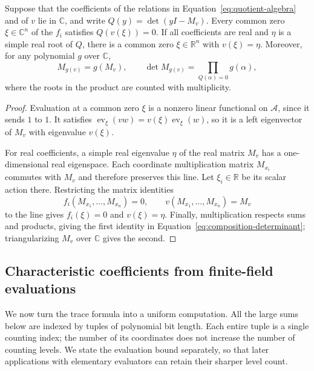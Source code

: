 \begin{lemma}\label{lem:real-eigenline}
Suppose that the coefficients of the relations in
Equation~\eqref{eq:quotient-algebra} and of $v$ lie in $\mathbb C$,
and write $Q(y)=\det(yI-M_v)$.  Every common zero
$\xi\in\mathbb C^n$ of the $f_i$ satisfies $Q(v(\xi))=0$.
If all coefficients are real and $\eta$ is a simple real root of $Q$,
there is a common zero $\xi\in\mathbb R^n$ with $v(\xi)=\eta$.
Moreover, for any polynomial $g$ over $\mathbb C$,
\begin{equation}\label{eq:composition-determinant}
 M_{g(v)}=g(M_v),\qquad
 \det M_{g(v)}=\prod_{Q(\alpha)=0}g(\alpha),
\end{equation}
where the roots in the product are counted with multiplicity.
\end{lemma}

\begin{proof}
Evaluation at a common zero $\xi$ is a nonzero linear functional on
$\mathcal A$, since it sends $1$ to $1$.  It satisfies
$\operatorname{ev}_\xi(vw)=v(\xi)\operatorname{ev}_\xi(w)$,
so it is a left eigenvector of $M_v$ with eigenvalue $v(\xi)$.

For real coefficients, a simple real eigenvalue $\eta$ of the real
matrix $M_v$ has a one-dimensional real eigenspace.  Each coordinate
multiplication matrix $M_{x_i}$ commutes with $M_v$ and therefore
preserves this line.  Let $\xi_i\in\mathbb R$ be its scalar action
there.  Restricting the matrix identities
\[
 f_i(M_{x_1},\ldots,M_{x_n})=0,\qquad
 v(M_{x_1},\ldots,M_{x_n})=M_v
\]
to the line gives $f_i(\xi)=0$ and $v(\xi)=\eta$.
Finally, multiplication respects sums and products, giving the first
identity in Equation~\eqref{eq:composition-determinant}; triangularizing
$M_v$ over $\mathbb C$ gives the second.
\end{proof}

\subsection{Characteristic coefficients from finite-field evaluations}

We now turn the trace formula into a uniform computation.  All the
large sums below are indexed by tuples of polynomial bit length.
Each entire tuple is a single counting index; the number of its
coordinates does not increase the number of counting levels.
We state the evaluation bound separately, so that later applications
with elementary evaluators can retain their sharper level count.

